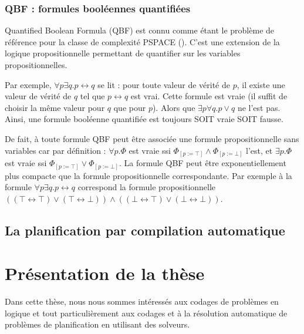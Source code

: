 \subsubsection{QBF : formules booléennes quantifiées}
Quantified Boolean Formula (QBF) est connu comme étant le problème de référence pour la classe de complexité PSPACE (\cite{Stockmeyer:1973:WPR:800125.804029}). C'est une extension de la logique propositionnelle permettant de quantifier sur les variables propositionnelles. 

Par exemple, $\forall p \exists q.p \leftrightarrow q$ se lit : pour toute valeur de vérité de $p$, il existe une valeur de vérité de $q$ tel que $p \leftrightarrow q$ est vrai. Cette formule est vraie (il suffit de choisir la même valeur pour $q$ que pour $p$). Alors que  $\exists p \forall q.p \lor q$ ne l'est pas. Ainsi, une formule booléenne quantifiée est toujours SOIT vraie SOIT fausse. 

De fait, à toute formule QBF peut être associée une formule propositionnelle sans variables car par définition : 
$\forall p.\Phi$ est vraie ssi $\Phi_{[p:=\top]} \wedge \Phi_{[p:=\bot]}$ l'est, et $\exists p.\Phi$ est vraie ssi $\Phi_{[p:=\top]} \vee \Phi_{[p:=\bot]}$. 
La formule QBF peut être exponentiellement plus compacte que la formule propositionnelle correspondante. Par exemple à la formule $\forall p \exists q.p \leftrightarrow q$ correspond la formule propositionnelle %
$(%
(\top \leftrightarrow \top)\vee (\top \leftrightarrow \bot) )%
\wedge (%
(\bot \leftrightarrow \top)\vee (\bot \leftrightarrow \bot) )%
$.

\subsection{La planification par compilation automatique}


\section{Présentation de la thèse}

Dans cette thèse, nous nous sommes intéressés aux codages de problèmes en logique et tout particulièrement aux codages et à la résolution automatique de problèmes de planification en utilisant des solveurs.

